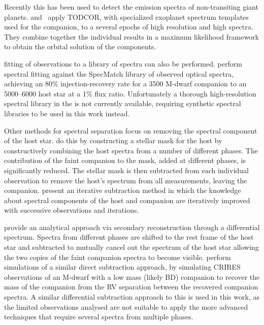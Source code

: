 Recently this has been used to detect the emission spectra of non-transiting giant planets.
\citet{lockwood_nearir_2014} and~\citet{piskorz_evidence_2016} apply TODCOR, with specialized exoplanet spectrum templates used for the companion, to a several epochs of high resolution and high \snr{} \nir{} spectra.
They combine together the individual results in a maximum likelihood framework to obtain the orbital solution of the components.

\textchisquared{} fitting of observations to a library of spectra can also be performed.
\citet{kolbl_detection_2015} perform spectral fitting against the {SpecMatch} library of observed optical spectra, achieving an 80\% injection-recovery rate for a 3500\K{} {M-dwarf} companion to an 5000--6000\K{} host star at a 1\% flux ratio.
Unfortunately a thorough high-resolution spectral library in the \nir{} is not currently available, requiring synthetic spectral libraries to be used in this work instead.

Other methods for spectral separation focus on removing the spectral component of the host star.
\citet{rodler_weighing_2012} do this by constructing a stellar mask for the host by constructively combining the host spectra from a number of different phases.
The contribution of the faint companion to the mask, added at different phases, is significantly reduced.
The stellar mask is then subtracted from each individual observation to remove the host's spectrum from all measurements, leaving the companion.
\citet{gonzalez_separation_2006} present an iterative subtraction method in which the knowledge about spectral components of the host and companion are iteratively improved with successive observations and iterations.

\citet{ferluga_separating_1997} provide an analytical approach via secondary reconstruction through a differential spectrum.
Spectra from different phases are shifted to the rest frame of the host star and subtracted to mutually cancel out the spectrum of the host star allowing the two copies of the faint companion spectra to become visible.
\citet{kostogryz_spectral_2013} perform simulations of a similar direct subtraction approach, by simulating CRIRES observations of an {M-dwarf} with a low mass (likely BD) companion to recover the mass of the companion from the {RV} separation between the recovered companion spectra.
A similar differential subtraction approach to this is used in this work, as the limited observations analysed are not suitable to apply the more advanced techniques that require several spectra from multiple phases.
